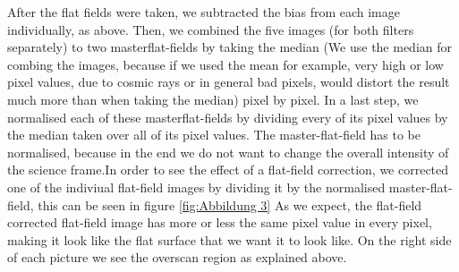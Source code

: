 \noindent
 After the flat fields were taken, we subtracted the bias from each image individually, as above. Then, we combined the five images (for both filters separately) to two masterflat-fields by taking the median (We use the median for combing the images, because if we used the mean for example, very high or low pixel values, due to cosmic rays or in general bad pixels, would distort the result much more than when taking the median) pixel by pixel. In a last step, we normalised each of these masterflat-fields by dividing every of its pixel values by the median taken over all of its pixel values.
 The master-flat-field has to be normalised, because in the end we do not want to change the overall intensity of the science frame.In order to see the effect of a flat-field correction, we corrected one of the indiviual flat-field images by dividing it by the normalised master-flat-field, this can be seen in figure \ref{fig:Abbildung 3}
As we expect, the flat-field corrected flat-field image has more or less the same pixel value in every pixel, making it look like the flat surface that we want it to look like. On the right side of each picture we see the overscan region as explained above.\\

